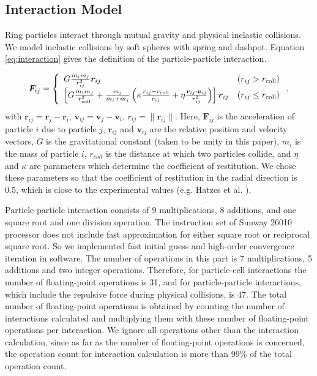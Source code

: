 \documentclass[oribibl]{llncs}
\begin{document}
\subsection{Interaction Model}

Ring particles interact through mutual gravity and physical inelastic
collisions. We model inelastic collisions by soft spheres with spring
and dashpot. Equation \ref{eq:interaction} gives the definition of the
particle-particle interaction.

\begin{eqnarray}
  \bm F_{ij} = \left \{
  \begin{array}{ll}
     G \frac{m_i m_j}{r_{ij}^3} \bm r_{ij} & \left(r_{ij} > r_{\rm coll} \right) \\
     \left[  G \frac{m_i m_j} {r_{\rm coll}^3} + \frac{m_j}{m_i + m_j} \left( \kappa \frac{ r_{ij} - r_{\rm coll}}{r_{ij}} + \eta \frac{\bm r_{ij} \cdot \bm v_{ij}}{r_{ij}^2} \right) \right] \bm r_{ij} & \left( r_{ij} \le r_{\rm coll} \right)
  \end{array}
  \right.
\label{eq:interaction} 
,
\end{eqnarray}
with $\bm r_{ij} = \bm r_j - \bm r_i$, $\bm v_{ij} = \bm v_j - \bm
v_i$, $r_{ij} = \| \bm r_{ij} \|$. Here, $\bm F_{ij}$ is the
acceleration of particle $i$ due to particle $j$, ${\mathbf r_{ij}}$ and
$\bm v_{ij}$ are the relative position and velocity vectors, $G$
is the gravitational constant (taken to be unity in this paper), $m_i$
is the mass of particle $i$, $r_{coll}$ is the distance at which two
particles collide, and $\eta$ and $\kappa$ are parameters which
determine the coefficient of restitution. We chose these parameters so
that the coefficient of restitution in the radial direction is 0.5, which is close to the experimental values (e.g. Hatzes et al. \cite{hatzes88:_collis}).

Particle-particle interaction consists of 9 multiplications, 8
additions, and one square root and one division
operation. The instruction set of Sunway 26010 processor does not include
fast approximation for either square root or reciprocal square
root. So we implemented fast initial guess and high-order convergence
iteration in software. The number of operations in this part is 7
multiplications, 5 additions and two integer operations. Therefore,
for particle-cell interactions the number of floating-point operations
is 31, and for particle-particle interactions, which include the
repulsive force during physical collisions, is 47. The total number of
floating-point operations is obtained by counting the number of
interactions calculated and multiplying them with these number of
floating-point operations per interaction. We ignore all operations
other than the interaction calculation, since as far as the number of
floating-point operations is concerned, the operation count for interaction
calculation is more than 99\% of the total operation count.
\end{document}
